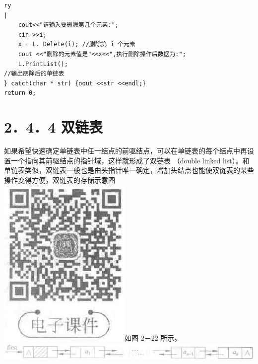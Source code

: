 \documentclass[10pt]{article}
\begin{document}
\begin{verbatim}
ry
|
    cout<<"请输入要删除第几个元素:";
    cin >>i;
    x = L. Delete(i); //删除第 i 个元素
    cout <<"删除的元素值是"<<x<<",执行删除操作后数据为:";
    L.PrintList();
//输出朋除后的单链表
} catch(char * str) {oout <<str <<endl;}
return 0;
\end{verbatim}

\section*{2．4．4 双链表}
如果希望快速确定单链表中任一结点的前驱结点，可以在单链表的每个结点中再设置一个指向其前驱结点的指针域，这样就形成了双链表 （double linked list）。和单链表类似，双链表一般也是由头指针唯一确定，增加头结点也能使双链表的某些操作变得方便，双链表的存储示意图\\
\includegraphics[max width=\textwidth]{2025_06_06_704745ea57b15b2333e5g-062}如图 2－22 所示。\\
\includegraphics[max width=\textwidth, center]{2025_06_06_704745ea57b15b2333e5g-062(1)}
\end{document}
